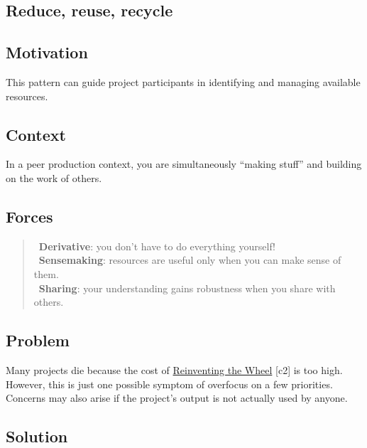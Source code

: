 \hypertarget{reduce-reuse-recycle}{%
\subsection{Reduce, reuse, recycle}\label{reduce-reuse-recycle}}

\hypertarget{motivation}{%
\subsection{Motivation}\label{motivation}}

This pattern can guide project participants in identifying and managing
available resources.

\hypertarget{context}{%
\subsection{Context}\label{context}}

In a peer production context, you are simultaneously ``making stuff''
and building on the work of others.

\hypertarget{forces}{%
\subsection{Forces}\label{forces}}

\begin{quote}
\Sderivative\ \textbf{Derivative}: you don't have to do everything yourself!\\
\Ssensemaking\ \textbf{Sensemaking}: resources are useful only when you can make sense of them.\\
\Ssharing\ \textbf{Sharing}: your understanding gains robustness when you share with others.
\end{quote}

\hypertarget{problem}{%
\subsection{Problem}\label{problem}}

Many projects die because the cost of
{{\href{http://c2.com/cgi/wiki?ReinventingTheWheel}{Reinventing the
Wheel}}} {[}c2{]} is too high. However, this is just one possible
symptom of overfocus on a few priorities. Concerns may also arise if the
project's output is not actually used by anyone.

\hypertarget{solution}{%
\subsection{Solution}\label{solution}}

